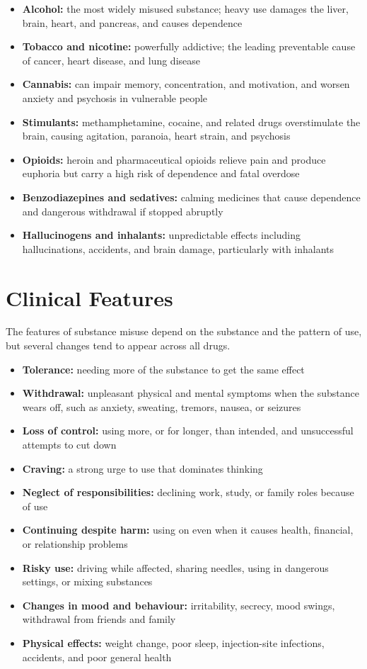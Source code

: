\begin{itemize}
    \item \textbf{Alcohol:} the most widely misused substance; heavy use damages the liver, brain, heart, and pancreas, and causes dependence
    \item \textbf{Tobacco and nicotine:} powerfully addictive; the leading preventable cause of cancer, heart disease, and lung disease
    \item \textbf{Cannabis:} can impair memory, concentration, and motivation, and worsen anxiety and psychosis in vulnerable people
    \item \textbf{Stimulants:} methamphetamine, cocaine, and related drugs overstimulate the brain, causing agitation, paranoia, heart strain, and psychosis
    \item \textbf{Opioids:} heroin and pharmaceutical opioids relieve pain and produce euphoria but carry a high risk of dependence and fatal overdose
    \item \textbf{Benzodiazepines and sedatives:} calming medicines that cause dependence and dangerous withdrawal if stopped abruptly
    \item \textbf{Hallucinogens and inhalants:} unpredictable effects including hallucinations, accidents, and brain damage, particularly with inhalants
\end{itemize}

\section*{Clinical Features}
The features of substance misuse depend on the substance and the pattern of use, but several changes tend to appear across all drugs.

\begin{itemize}
    \item \textbf{Tolerance:} needing more of the substance to get the same effect
    \item \textbf{Withdrawal:} unpleasant physical and mental symptoms when the substance wears off, such as anxiety, sweating, tremors, nausea, or seizures
    \item \textbf{Loss of control:} using more, or for longer, than intended, and unsuccessful attempts to cut down
    \item \textbf{Craving:} a strong urge to use that dominates thinking
    \item \textbf{Neglect of responsibilities:} declining work, study, or family roles because of use
    \item \textbf{Continuing despite harm:} using on even when it causes health, financial, or relationship problems
    \item \textbf{Risky use:} driving while affected, sharing needles, using in dangerous settings, or mixing substances
    \item \textbf{Changes in mood and behaviour:} irritability, secrecy, mood swings, withdrawal from friends and family
    \item \textbf{Physical effects:} weight change, poor sleep, injection-site infections, accidents, and poor general health
\end{itemize}

